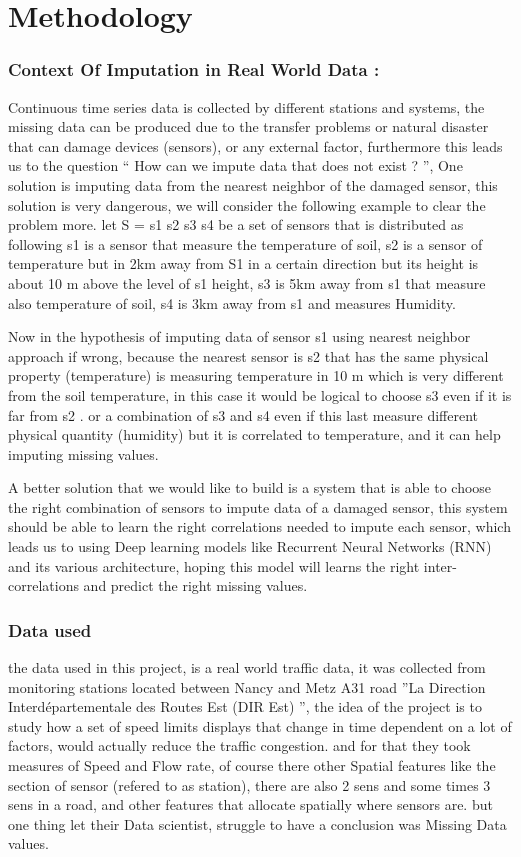 
\chapter{Methodology} \label{ML}


\subsection{Context Of Imputation in Real World Data :}
 Continuous time series data is collected by different stations and systems, the missing data can be produced due to the transfer problems or natural disaster that can damage devices (sensors), or any external factor, furthermore this leads us to the question “ How can we impute data that does not exist ? ”, One solution is imputing  data from the nearest neighbor of the damaged sensor, this solution is very dangerous, we will  consider the following example to clear the problem more.
let S = {s1 s2 s3 s4 } be a set of sensors that is distributed as following s1 is a sensor  that measure the temperature of soil, s2 is a sensor of temperature but in 2km away from S1 in a certain direction but its height is about 10 m above the level of s1 height, s3  is 5km away from s1 that measure also temperature of soil,  s4  is 3km away from s1  and  measures Humidity.

Now in the hypothesis of imputing data of sensor s1  using nearest neighbor approach if wrong, because the nearest  sensor is s2  that has the same physical property (temperature) is measuring  temperature in 10 m which is very different from the soil temperature, in this case it would be logical to choose s3 even if it is far from s2 . or a combination of s3 and s4 even if this last measure different physical quantity (humidity) but it is correlated to temperature, and it can help imputing missing values.

A better solution that we would like to build is a system that is able to choose the right combination of sensors to impute data of a damaged sensor, this system should be able to learn the right correlations needed to impute each sensor, which leads us to using Deep learning models like Recurrent Neural Networks (RNN) and its various architecture, hoping this model will learns the right inter-correlations and predict the right missing values.

\subsection{Data used}
the  data used in this project, is a real world traffic data, it was collected from  monitoring stations located between Nancy and  Metz  A31  road ''La Direction Interdépartementale des Routes Est (DIR Est) '', the idea of the project is to study  how  a set of speed limits displays that change in time dependent on a lot of factors, would actually reduce the traffic congestion.
and for that they took measures of Speed and Flow rate, of course there other Spatial features like the section of sensor (refered to as station), there are also 2 sens and some times 3 sens in a road, and other features that allocate spatially where sensors are.
but one thing let their Data scientist, struggle to have a conclusion was Missing Data values.


